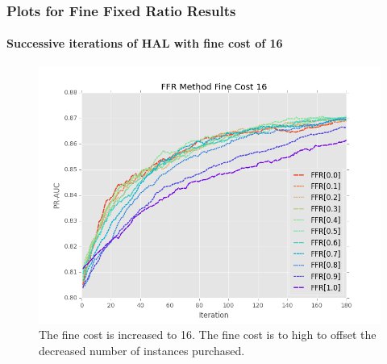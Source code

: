 \documentclass{beamer}
\begin{document}
\begin{frame}
    \frametitle{Plots for Fine Fixed Ratio Results}  %
    \framesubtitle{Successive iterations of HAL with fine cost of 16}
    \begin{figure}[!htb]
        \centering
        \includegraphics[width=0.8\columnwidth]{fig/ParamsFFR_PR_Cost16_rnds0_180}
        \caption{The fine cost is increased to 16. The fine cost is to high to offset the decreased number of instances purchased.}
        \label{fig:ParamsFFR_PR_Cost16_rnds0_180}
    \end{figure}
\end{frame}
\end{document}

